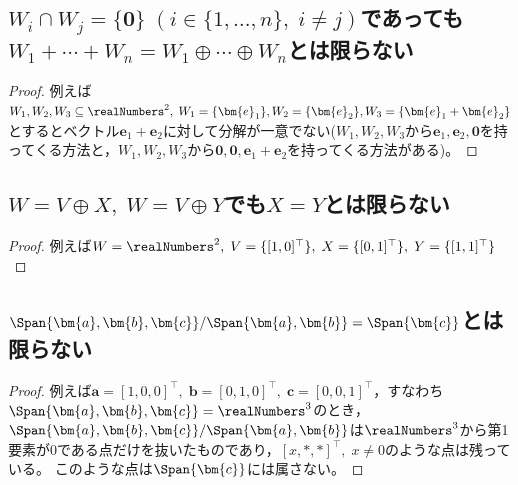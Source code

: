         \subsection{\texorpdfstring{$W_i\cap W_j=\{\bm{0}\}\;(i\in\{1,\dotsc,n\},\;i\neq j)$}{Wi⋂Wj=\{0\}}であっても\texorpdfstring{$W_1+\dotsb+W_n = W_1\oplus\dotsb\oplus W_n$}{W1+...+Wn = W1⊕...⊕Wn}とは限らない}
            \begin{proof}
                \quad\par
                例えば$W_1,W_2,W_3\subseteq\realNumbers^2,\;W_1=\{\bm{e}_1\},W_2=\{\bm{e}_2\},W_3=\{\bm{e}_1+\bm{e}_2\}$とするとベクトル$\bm{e}_1+\bm{e}_2$に対して分解が一意でない($W_1,W_2,W_3$から$\bm{e}_1,\bm{e}_2,\bm{0}$を持ってくる方法と，$W_1,W_2,W_3$から$\bm{0},\bm{0},\bm{e}_1+\bm{e}_2$を持ってくる方法がある)。
            \end{proof}
        \subsection{\texorpdfstring{$W=V\oplus X,\;W=V\oplus Y$}{W=V⊕X, W=V⊕Y}でも\texorpdfstring{$X=Y$}{X=Y}とは限らない}
            \begin{proof}
                例えば$W=\realNumbers^2,\;V=\{[1,0]^\top\},\;X=\{[0,1]^\top\},\;Y=\{[1,1]^\top\}$
            \end{proof}
        \subsection{\texorpdfstring{$\Span{\bm{a},\bm{b},\bm{c}}/\Span{\bm{a},\bm{b}} = \Span{\bm{c}}$}{Span[a,b,c]/Span[a,b]=Span[c]}とは限らない}
            \begin{proof}
                \quad\par
                例えば$\bm{a}=[1,0,0]^\top,\;\bm{b}=[0,1,0]^\top,\;\bm{c}=[0,0,1]^\top$，すなわち$\Span{\bm{a},\bm{b},\bm{c}}=\realNumbers^3$のとき，
                $\Span{\bm{a},\bm{b},\bm{c}}/\Span{\bm{a},\bm{b}}$は$\realNumbers^3$から第1要素が0である点だけを抜いたものであり，$[x,*,*]^\top,\;x\neq 0$のような点は残っている。
                このような点は$\Span{\bm{c}}$には属さない。
            \end{proof}